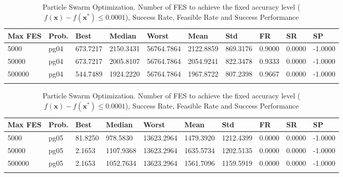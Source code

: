 \documentclass[10pt, a4paper]{book}
\begin{document}
\begin{center}
\begin{longtable}{l l l l l l l l l l}
\textbf{Max FES} & \textbf{Prob.} & \textbf{Best} & \textbf{Median} & \textbf{Worst} & \textbf{Mean} & \textbf{Std} & \textbf{FR} & \textbf{SR} & \textbf{SP} \\
\hline
5000 & pg04 & 673.7217 & 2150.3431 & 56764.7864 & 2122.8859 & 869.3176 & 0.9000 & 0.0000 & -1.0000 \\
50000 & pg04 & 673.7217 & 2005.8107 & 56764.7864 & 2054.9241 & 822.3478 & 0.9333 & 0.0000 & -1.0000 \\
500000 & pg04 & 544.7489 & 1924.2220 & 56764.7864 & 1967.8722 & 807.2398 & 0.9667 & 0.0000 & -1.0000 \\

\caption{ Particle Swarm Optimization. Number of FES to achieve the fixed accuracy level ($f(\mathbf{x}) - f(\mathbf{x}^{*}) \leq 0.0001$), Success Rate, Feasible Rate and Success Performance }
\end{longtable}
\end{center}

\begin{center}
\begin{longtable}{l l l l l l l l l l}
\textbf{Max FES} & \textbf{Prob.} & \textbf{Best} & \textbf{Median} & \textbf{Worst} & \textbf{Mean} & \textbf{Std} & \textbf{FR} & \textbf{SR} & \textbf{SP} \\
\hline
5000 & pg05 & 81.8250 & 978.5830 & 13623.2964 & 1479.3920 & 1212.4399 & 0.0000 & 0.0000 & -1.0000 \\
50000 & pg05 & 2.1653 & 1107.9368 & 13623.2964 & 1635.5734 & 1202.5135 & 0.0000 & 0.0000 & -1.0000 \\
500000 & pg05 & 2.1653 & 1052.7634 & 13623.2964 & 1561.7096 & 1159.5919 & 0.0000 & 0.0000 & -1.0000 \\

\caption{ Particle Swarm Optimization. Number of FES to achieve the fixed accuracy level ($f(\mathbf{x}) - f(\mathbf{x}^{*}) \leq 0.0001$), Success Rate, Feasible Rate and Success Performance }
\end{longtable}
\end{center}
\end{document}
